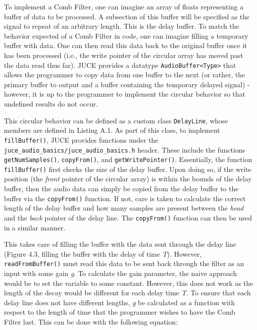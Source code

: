 To implement a Comb Filter, one can imagine an array of floats representing a buffer of data to be processed. A subsection of this buffer will be specified as the signal to repeat of an arbitrary length. This is the delay buffer. To match the behavior expected of a Comb Filter in code, one can imagine filling a temporary buffer with data. One can then read this data back to the original buffer once it has been processed (i.e., the write pointer of the circular array has moved past the data read thus far). JUCE provides a datatype \verb|AudioBuffer<Type>| that allows the programmer to copy data from one buffer to the next (or rather, the primary buffer to output and a buffer containing the temporary delayed signal) - however, it is up to the programmer to implement the circular behavior so that undefined results do not occur.
\lstset{language =[ANSI]C++}
\lstset{linewidth=.95\textwidth,breaklines=true}
\lstset{commentstyle=\textit,stringstyle=\upshape,showspaces=false}
\lstset{frame = single}
\lstset{numbers=left,numberstyle=\tiny,basicstyle=\small}
\lstset{commentstyle=\normalfont\itshape,breakautoindent=true}
\lstset{abovecaptionskip=1.2\baselineskip,xleftmargin=30pt}
\lstset{framesep=6pt}
\begin{singlespace}

\end{singlespace} \hfill \break
\hspace*{0.6cm}This circular behavior can be defined as a custom class \verb|DelayLine|, whose members are defined in Listing A.1. As part of this class, to implement \verb|fillBuffer()|, JUCE provides functions under the \verb|juce_audio_basics/juce_audio_basics.h| header. These include the functions \verb|getNumSamples()|, \verb|copyFrom()|, and \verb|getWritePointer()|. Essentially, the function \verb|fillBuffer()| first checks the size of the delay buffer. Upon doing so, if the write position (the \textit{front} pointer of the circular array) is within the bounds of the delay buffer, then the audio data can simply be copied from the delay buffer to the buffer via the \verb|copyFrom()| function. If not, care is taken to calculate the correct length of the delay buffer and how many samples are present between the \textit{head} and the \textit{back} pointer of the delay line. The \verb|copyFrom()| function can then be used in a similar manner.

This takes care of filling the buffer with the data sent through the delay line (Figure 4.3, filling the buffer with the delay of time \textit{T}). However, \verb|readFromBuffer()| must read this data to be sent back through the filter as an input with some gain \textit{g}. To calculate the gain parameter, the naive approach would be to set the variable to some constant. However, this does not work as the length of the decay would be different for each delay time \textit{T}. To ensure that each delay line does not have different lengths, \textit{g} be calculated as a function with respect to the length of time that the programmer wishes to have the Comb Filter last. This can be done with the following equation:

